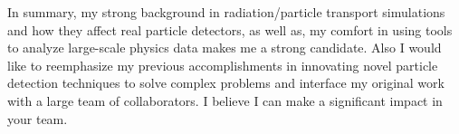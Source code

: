 \documentclass[11pt]{article} %
\begin{document}

In summary, my strong background in radiation/particle transport simulations and
how they affect real particle detectors, as well as, my comfort in using tools
to analyze large-scale physics data makes me a strong candidate. Also I would
like to reemphasize my previous accomplishments in innovating novel particle
detection techniques to solve complex problems and interface my original work
with a large team of collaborators. I believe I can make a significant impact
in your team.
\end{document}
